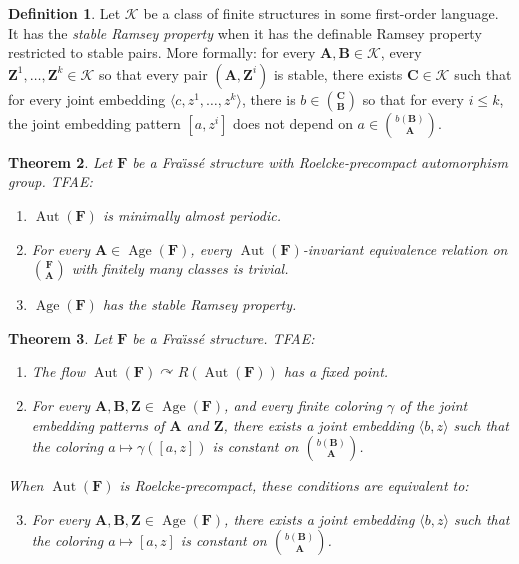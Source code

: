 \documentclass[11pt]{article}
\newtheorem{theo}{Theorem}[section]
\theoremstyle{definition}
\newtheorem{defi}[theo]{Definition}
\numberwithin{equation}{section}
\numberwithin{figure}{section}
\numberwithin{table}{section}
\newcommand{\K}{\mathcal{K}}
\newcommand*{\mA}{\mathbf{A}}
\newcommand*{\mB}{\mathbf{B}}
\newcommand*{\mC}{\mathbf{C}}
\newcommand*{\mF}{\mathbf{F}}
\newcommand*{\mZ}{\mathbf{Z}}
\DeclareMathOperator{\Aut}{Aut}
\DeclareMathOperator{\Age}{Age}
\newcommand{\actson}{\curvearrowright}
\begin{document}
\begin{defi}
Let $\K$ be a class of finite structures in some first-order language. It has the \emph{stable Ramsey property} when it has the definable Ramsey property restricted to stable pairs. More formally: for every $\mA, \mB\in \K$, every $\mZ^{1},\ldots,\mZ^{k}\in \K$ so that every pair $(\mA, \mZ^{i})$ is stable, there exists $\mC \in \K$ such that for every joint embedding $\langle c,z^{1},\ldots,z^{k}\rangle$, there is $b\in \binom{\mC}{\mB}$ so that for every $i\leq k$, the joint embedding pattern $[a,z^{i}]$ does not depend on $a\in \binom{b(\mB)}{\mA}$.
\end{defi}

\begin{theo}\label{thm:MAPStableRP}
Let $\mF$ be a Fra\"{\i}ss\'e structure with Roelcke-precompact automorphism group. TFAE:
\begin{enumerate}
\item \label{1.6.1} $\Aut(\mF)$ is minimally almost periodic.
\item \label{1.6.2} For every $\mA\in \Age(\mF)$, every $\Aut(\mF)$-invariant equivalence relation on $\binom{\mF}{\mA}$ with finitely many classes is trivial.
\item \label{1.6.3} $\Age(\mF)$ has the stable Ramsey property.
\end{enumerate}
\end{theo}

\begin{theo}\label{thm:fpRoecke}
Let $\mF$ be a Fra\"{\i}ss\'e structure. TFAE:
\begin{enumerate}
\item \label{1.7.1} The flow $\Aut(\mF)\actson R(\Aut(\mF))$ has a fixed point.
\item \label{1.7.2} For every $\mA, \mB, \mZ\in \Age(\mF)$, and every finite coloring $\gamma$ of the joint embedding patterns of $\mA$ and $\mZ$, there exists a joint embedding $\langle b,z\rangle$ such that the coloring $a\mapsto \gamma([a,z])$ is constant on $\binom{b(\mB)}{\mA}$.
\end{enumerate}

When $\Aut(\mF)$ is Roelcke-precompact, these conditions are equivalent to:
\begin{enumerate}
\setcounter{enumi}{2}
\item \label{1.7.3} For every $\mA, \mB, \mZ\in \Age(\mF)$, there exists a joint embedding $\langle b,z\rangle$ such that the coloring $a\mapsto [a,z]$ is constant on $\binom{b(\mB)}{\mA}$.
\end{enumerate}
\end{theo}
\end{document}
